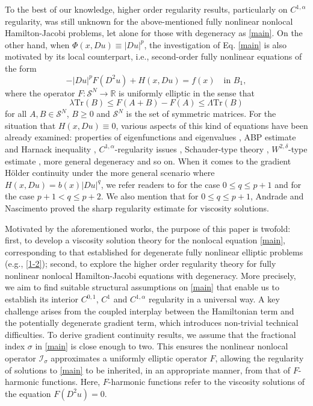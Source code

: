 \documentclass[11pt,reqno]{amsart}
\numberwithin{equation}{section}
\begin{document}
To the best of our knowledge, higher order regularity results, particularly on $C^{1, \alpha}$ regularity, was still unknown for the above-mentioned fully nonlinear nonlocal Hamilton-Jacobi problems, let alone for those with degeneracy as \eqref{main}. On the other hand, when $\Phi(x, Du)\equiv |Du|^p$, the investigation of Eq. \eqref{main} is also motivated by its local counterpart, i.e., second-order fully nonlinear equations of the form
\begin{equation}
\label{1-2}
-|Du|^pF(D^2u)+H(x,Du)=f(x) \quad \text{in } B_1,
\end{equation}
where the operator $F: \mathcal{S}^N\rightarrow\mathbb{R}$ is uniformly elliptic in the sense that
$$
\lambda\mathrm{Tr}(B)\le F(A+B)-F(A)\le\Lambda\mathrm{Tr}(B)
$$
for all $A, B\in\mathcal{S}^N$, $B\ge0$ and $\mathcal{S}^N$ is the set of symmetric matrices. For the situation that $H(x, Du)\equiv0$, various aspects of this kind of equations have been already examined: properties of eigenfunctions and eigenvalues \cite{BD10}, ABP estimate and Harnack inequality \cite{Imb11}, $C^{1,\alpha}$-regularity issues \cite{ART15,IS13}, Schauder-type theory \cite{Nas24}, $W^{2,\delta}$-type estimate \cite{BKO25}, more general degeneracy \cite{BBLL,DeF,FRZ21,JLMS} and so on. When it comes to the gradient H\"{o}lder continuity under the more general scenario where $H(x,Du)=b(x)|Du|^q$, we refer readers to \cite{BD16} for the case $0\le q\le p+1$ and \cite{BDL19} for the case $p+1<q\le p+2$. We also mention that for $0\le q\le p+1$, Andrade and Nascimento \cite{AN25} proved the sharp regularity estimate for viscosity solutions.

Motivated by the aforementioned works, the purpose of this paper is twofold: first, to develop a viscosity solution theory for the nonlocal equation \eqref{main}, corresponding to that established for degenerate fully nonlinear elliptic problems (e.g., \eqref{1-2}); second, to explore the higher order regularity theory for fully nonlinear nonlocal Hamilton-Jacobi equations with degeneracy. More precisely, we aim to find suitable structural assumptions on \eqref{main} that enable us to establish its interior $C^{0,1}$, $C^1$ and $C^{1, \alpha}$ regularity in a universal way. A key challenge arises from the coupled interplay between the Hamiltonian term and the potentially degenerate gradient term, which introduces non-trivial technical difficulties. To derive gradient continuity results, we assume that the fractional index $\sigma$ in \eqref{main} is close enough to two. This ensures the nonlinear nonlocal operator $\mathcal{I}_\sigma$ approximates a uniformly elliptic operator $F$, allowing the regularity of solutions to \eqref{main} to be inherited, in an appropriate manner, from that of $F$-harmonic functions. Here, $F$-harmonic functions refer to the viscosity solutions of the equation $F(D^2 u)=0$.
\end{document}
